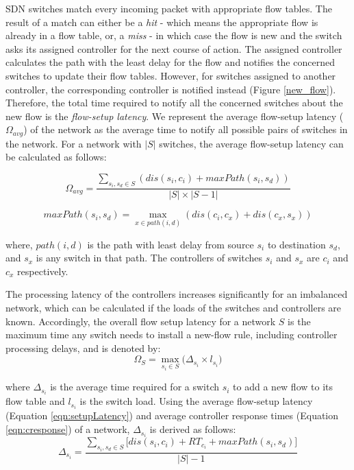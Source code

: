 \documentclass[final,5p,times]{cas-dc}
\begin{document}
	SDN switches match every incoming packet with appropriate flow tables. The result of a match can either be a \textit{hit} - which means the appropriate flow is already in a flow table, or, a \textit{miss} - in which case the flow is new and the switch asks its assigned controller for the next course of action. The assigned controller calculates the path with the least delay for the flow and notifies the concerned switches to update their flow tables. However, for switches assigned to another controller, the corresponding controller is notified instead (Figure \ref{new_flow}). Therefore, the total time required to notify all the concerned switches about the new flow is the \textit{flow-setup latency}. We represent the average flow-setup latency ($\Omega_{avg}$) of the network as the average time to notify all possible pairs of switches in the network. For a network with $|S|$ switches, the average flow-setup latency can be calculated as follows:
	
	\begin{equation} \label{eqn:setupLatency}
	\Omega_{avg} = \frac{\sum_{s_i,s_d\in S} \left(dis(s_i,c_i)+ maxPath(s_i,s_d)\right)}{|S|\times |S-1|}
	\end{equation}
	
	\begin{equation}
	maxPath(s_i,s_d) = \max_{x\in path(i,d)}\left(dis(c_i,c_x)+dis(c_x,s_x) \right)
	\end{equation}
	
	where, $path(i,d)$ is the path with least delay from source $s_i$ to destination $s_d$, and $s_x$ is any switch in that path. The controllers of switches $s_i$ and $s_x$ are $c_i$ and $c_x$ respectively.
	
	The processing latency of the controllers increases significantly for an imbalanced network, which can be calculated if the loads of the switches and controllers are known. Accordingly, the overall flow setup latency for a network $S$ is the maximum time any switch needs to install a new-flow rule, including controller processing delays, and is denoted by:
	\begin{equation}
	\Omega_S = \max_{s_i\in S} \bigg( \Delta_{s_i}\times l_{s_i} \bigg)
	\end{equation}
	
	where $\Delta_{s_i}$ is the average time required for a switch $s_i$ to add a new flow to its flow table and $l_{s_i}$ is the switch load. Using the average flow-setup latency (Equation \ref{eqn:setupLatency}) and average controller response times (Equation \ref{eqn:cresponse}) of a network, $\Delta_{s_i}$ is derived as follows:
	\begin{equation}
	\Delta_{s_i} = \frac{\sum_{s_i,s_d\in S} \bigg[dis(s_i,c_i)+RT_{c_i}+maxPath(s_i,s_d) \bigg]}{|S|-1}
	\end{equation}
	
\end{document}
